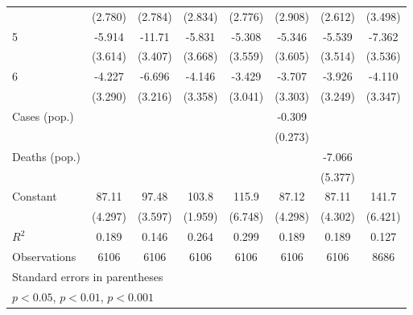 \documentclass{article}
\begin{document}
{\begin{longtable}{l*{7}{c}}
                &  (2.780)         &  (2.784)         &  (2.834)         &  (2.776)         &  (2.908)         &  (2.612)         &  (3.498)         \\
5               &   -5.914         &   -11.71\sym{**} &   -5.831         &   -5.308         &   -5.346         &   -5.539         &   -7.362\sym{*}  \\
                &  (3.614)         &  (3.407)         &  (3.668)         &  (3.559)         &  (3.605)         &  (3.514)         &  (3.536)         \\
6               &   -4.227         &   -6.696\sym{*}  &   -4.146         &   -3.429         &   -3.707         &   -3.926         &   -4.110         \\
                &  (3.290)         &  (3.216)         &  (3.358)         &  (3.041)         &  (3.303)         &  (3.249)         &  (3.347)         \\
Cases (pop.)    &                  &                  &                  &                  &   -0.309         &                  &                  \\
                &                  &                  &                  &                  &  (0.273)         &                  &                  \\
Deaths (pop.)   &                  &                  &                  &                  &                  &   -7.066         &                  \\
                &                  &                  &                  &                  &                  &  (5.377)         &                  \\
Constant        &    87.11\sym{***}&    97.48\sym{***}&    103.8\sym{***}&    115.9\sym{***}&    87.12\sym{***}&    87.11\sym{***}&    141.7\sym{***}\\
                &  (4.297)         &  (3.597)         &  (1.959)         &  (6.748)         &  (4.298)         &  (4.302)         &  (6.421)         \\
\hline
\(R^{2}\)       &    0.189         &    0.146         &    0.264         &    0.299         &    0.189         &    0.189         &    0.127         \\
Observations    &     6106         &     6106         &     6106         &     6106         &     6106         &     6106         &     8686         \\
\hline\hline
\multicolumn{8}{l}{\footnotesize Standard errors in parentheses}\\
\multicolumn{8}{l}{\footnotesize \sym{*} \(p<0.05\), \sym{**} \(p<0.01\), \sym{***} \(p<0.001\)}\\
\end{longtable}
}
\end{document}
